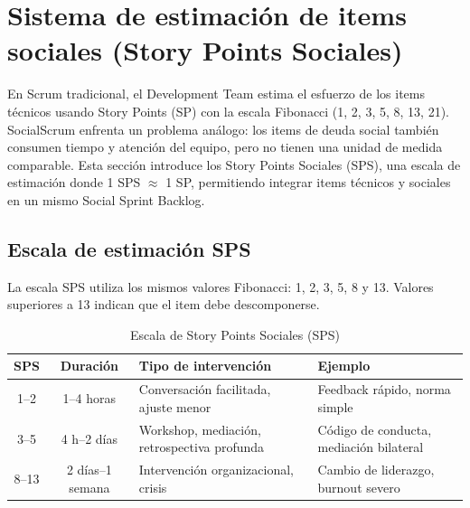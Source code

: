 \section{Sistema de estimación de items sociales (Story Points Sociales)}

En Scrum tradicional, el Development Team estima el esfuerzo de los items técnicos usando Story Points (SP) con la escala Fibonacci (1, 2, 3, 5, 8, 13, 21). SocialScrum enfrenta un problema análogo: los items de deuda social también consumen tiempo y atención del equipo, pero no tienen una unidad de medida comparable. Esta sección introduce los Story Points Sociales (SPS), una escala de estimación donde 1 SPS $\approx$ 1 SP, permitiendo integrar items técnicos y sociales en un mismo Social Sprint Backlog.

\subsection{Escala de estimación SPS}

La escala SPS utiliza los mismos valores Fibonacci: 1, 2, 3, 5, 8 y 13. Valores superiores a 13 indican que el item debe descomponerse.

\begin{table}[h]
    \centering
    \small
    \begin{tabularx}{\textwidth}{|c|c|X|X|}
        \hline
        \textbf{SPS} & \textbf{Duración}                           & \textbf{Tipo de intervención} & \textbf{Ejemplo} \\
        \hline
        1--2         & 1--4 horas
                     & Conversación facilitada, ajuste menor
                     & Feedback rápido, norma simple                                                                  \\
        \hline
        3--5         & 4 h--2 días
                     & Workshop, mediación, retrospectiva profunda
                     & Código de conducta, mediación bilateral                                                        \\
        \hline
        8--13        & 2 días--1 semana
                     & Intervención organizacional, crisis
                     & Cambio de liderazgo, burnout severo                                                            \\
        \hline
    \end{tabularx}
    \caption{Escala de Story Points Sociales (SPS)}
    \label{tab:escala-sps}
\end{table}
\FloatBarrier

